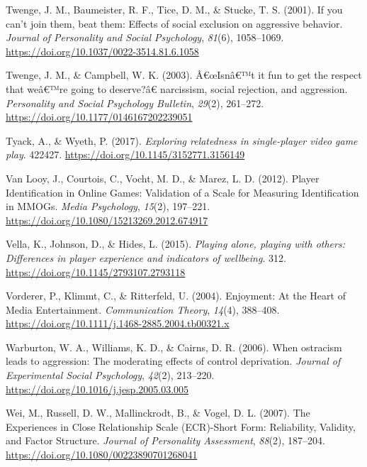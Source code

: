 \documentclass[
]{udthesis}
\newlength{\cslhangindent}
\newenvironment{CSLReferences}[2] %
 {\begin{list}{}{%
  \setlength{\itemindent}{0pt}
  \setlength{\leftmargin}{0pt}
  \setlength{\parsep}{0pt}
  \ifodd #1
   \setlength{\leftmargin}{\cslhangindent}
   \setlength{\itemindent}{-1\cslhangindent}
  \fi
  \setlength{\itemsep}{#2\baselineskip}}}
 {\end{list}}
\begin{document}
\begin{CSLReferences}{1}{0}
Twenge, J. M., Baumeister, R. F., Tice, D. M., \& Stucke, T. S. (2001). If you can't join them, beat them: {Effects} of social exclusion on aggressive behavior. \emph{Journal of Personality and Social Psychology}, \emph{81}(6), 1058--1069. \url{https://doi.org/10.1037/0022-3514.81.6.1058}

Twenge, J. M., \& Campbell, W. K. (2003). Â€œ{Isn}â€™t it fun to get the respect that weâ€™re going to deserve?â€ narcissism, social rejection, and aggression. \emph{Personality and Social Psychology Bulletin}, \emph{29}(2), 261--272. \url{https://doi.org/10.1177/0146167202239051}

Tyack, A., \& Wyeth, P. (2017). \emph{Exploring relatedness in single-player video game play}. 422427. \url{https://doi.org/10.1145/3152771.3156149}

Van Looy, J., Courtois, C., Vocht, M. D., \& Marez, L. D. (2012). Player {Identification} in {Online Games}: {Validation} of a {Scale} for {Measuring Identification} in {MMOGs}. \emph{Media Psychology}, \emph{15}(2), 197--221. \url{https://doi.org/10.1080/15213269.2012.674917}

Vella, K., Johnson, D., \& Hides, L. (2015). \emph{Playing alone, playing with others: Differences in player experience and indicators of wellbeing}. 312. \url{https://doi.org/10.1145/2793107.2793118}

Vorderer, P., Klimmt, C., \& Ritterfeld, U. (2004). Enjoyment: {At} the {Heart} of {Media Entertainment}. \emph{Communication Theory}, \emph{14}(4), 388--408. \url{https://doi.org/10.1111/j.1468-2885.2004.tb00321.x}

Warburton, W. A., Williams, K. D., \& Cairns, D. R. (2006). When ostracism leads to aggression: {The} moderating effects of control deprivation. \emph{Journal of Experimental Social Psychology}, \emph{42}(2), 213--220. \url{https://doi.org/10.1016/j.jesp.2005.03.005}

Wei, M., Russell, D. W., Mallinckrodt, B., \& Vogel, D. L. (2007). The {Experiences} in {Close Relationship Scale} ({ECR})-{Short Form}: {Reliability}, {Validity}, and {Factor Structure}. \emph{Journal of Personality Assessment}, \emph{88}(2), 187--204. \url{https://doi.org/10.1080/00223890701268041}


\end{CSLReferences}
\end{document}

